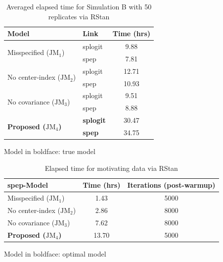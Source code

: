 \begin{center}
\begin{table}[H]
\caption{Averaged elapsed time for Simulation B with 50 replicates via RStan}
 \centering \small
 \begin{threeparttable}
  \begin{tabular}{l|l|c}
    \toprule
Model & Link & Time (hrs)  \\
 \hline 
 \multirow{2}{*}{Misspecified ($\mbox{JM}_1$)} & splogit & 9.88\\
                      & spep & 7.81\\
\hline
\multirow{2}{*}{No center-index ($\mbox{JM}_2$)} & splogit & 12.71\\
                      & spep & 10.93\\
\hline
\multirow{2}{*}{No covariance ($\mbox{JM}_3$)} & splogit & 9.51\\
                      & spep & 8.88\\
\hline
\multirow{2}{*}{\bf Proposed ($\mbox{JM}_4$)} & \bf splogit & 30.47\\
                      & \bf spep & 34.75\\                      
    \bottomrule
  \end{tabular}
   \begin{tablenotes}[para]
    \footnotesize
    Model in boldface: true model
    \end{tablenotes}
    \end{threeparttable}
\end{table}
\label{tab:appb_simB}
\end{center}

\begin{center}
\begin{table}[H]
\caption{Elapsed time for motivating data via RStan}
 \centering \small
 \begin{threeparttable}
  \begin{tabular}{l|c|c}
    \toprule
spep-Model & Time (hrs) & Iterations (post-warmup) \\
 \hline 
  Misspecified ($\mbox{JM}_1$) & 1.43 & 5000 \\
 No center-index ($\mbox{JM}_2$) & 2.86 & 8000 \\
 No covariance ($\mbox{JM}_3$) & 7.62 & 8000 \\
 \bf Proposed ($\mbox{JM}_4$) & 13.70 & 5000 \\
    \bottomrule
  \end{tabular}
   \begin{tablenotes}[para]
    \footnotesize
    Model in boldface: optimal model
    \end{tablenotes}
  \end{threeparttable}
\end{table}
\label{tab:appb_app}
\end{center}

